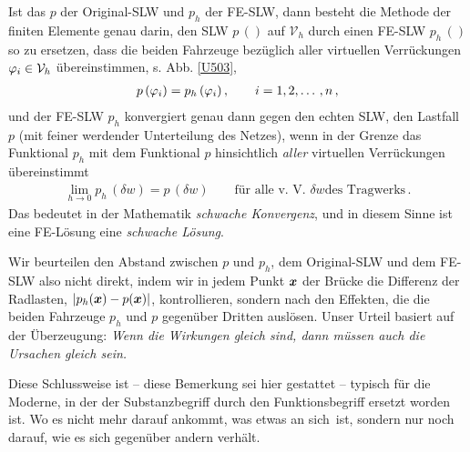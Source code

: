 Ist das $p$ der Original-SLW und $p_h$ der FE-SLW, dann besteht die Methode der finiten
Elemente genau darin, den SLW $p\,()$ auf $\mathcal{V}_h$ durch einen FE-SLW $p_h\,()$ so zu
ersetzen, dass die beiden Fahrzeuge bez\"{u}glich aller virtuellen Verr\"{u}ckungen $\varphi_i \in
\mathcal{V}_h$ \"{u}bereinstimmen, s. Abb. \ref{U503},
\begin{align}
p\,(\varphi_i) = p_h\,(\varphi_i)\,, \qquad i = 1,2,\ldots \,,n\,,
\end{align}
und der FE-SLW $p_h$ konvergiert genau dann gegen den echten SLW, den Lastfall $p$ (mit feiner werdender Unterteilung des Netzes), wenn in der Grenze das Funktional $p_h$ mit dem Funktional $p$ hinsichtlich {\em aller\/} virtuellen Verr\"{u}ckungen \"{u}bereinstimmt
\begin{align}
\lim_{h \to 0} p_h\,(\delta w) = p\,(\delta w) \qquad \mbox{f\"{u}r alle v. V. $\delta w$
des Tragwerks}\,.
\end{align}
Das bedeutet in der Mathematik {\em schwache Konvergenz}, und in diesem Sinne ist eine
FE-L\"{o}sung eine {\em schwache L\"{o}sung\/}.

Wir beurteilen den Abstand zwischen $p$ und $p_h$, dem Original-SLW und dem FE-SLW also nicht direkt, indem wir in jedem Punkt $\mbox{\boldmath $x$}$ der Br\"{u}cke die Differenz der Radlasten, $|p_h(\mbox{\boldmath $x$}) - p(\mbox{\boldmath $x$})|$, kontrollieren, sondern nach den Effekten, die die beiden Fahrzeuge $p_h$ und $p$ gegen\"{u}ber Dritten ausl\"{o}sen. Unser Urteil basiert auf der \"{U}berzeugung: {\em Wenn die Wirkungen gleich sind, dann m\"{u}ssen auch die Ursachen gleich sein.\/}

Diese Schlussweise ist -- diese Bemerkung sei hier gestattet -- typisch f\"{u}r die Moderne, in der der Substanzbegriff durch den Funktionsbegriff ersetzt worden ist. Wo es nicht mehr darauf ankommt, was etwas \glq an sich\grq\ ist, sondern nur noch darauf, wie es sich gegen\"{u}ber andern verh\"{a}lt.


